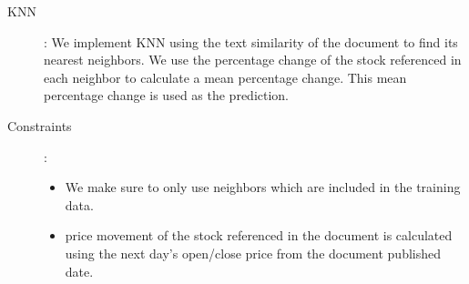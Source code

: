 \documentclass[11pt,letterpaper]{article}
\begin{document}
\begin{description}
	\item[KNN] : We implement KNN using the text similarity of the document to find its nearest neighbors. We use the
	percentage change of the stock referenced in each neighbor to calculate a mean percentage change. This mean
	percentage change is used as the prediction.
	\item[Constraints] :
    \begin{itemize}
      \item We make sure to only use neighbors which are included in the training data.
      \item price movement of the stock referenced in the document is calculated
            using the next day's open/close price from the document
            published date. ~\cite{stock-matrix}
    \end{itemize}
\end{description}
\end{document}
